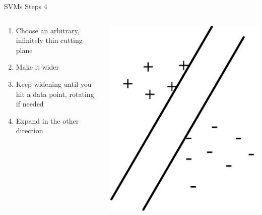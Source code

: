 \documentclass[aspectratio=169]{beamer}
\begin{document}
\begin{frame}{SVMs Steps 4}

\begin{columns}[T]
\begin{column}{0.6\textwidth}
\begin{enumerate}
\item  Choose an arbitrary, infinitely thin cutting plane
\item Make it wider
\item Keep widening until you hit a data point, rotating if needed
\item Expand in the other direction
\end{enumerate}
\end{column}
\begin{column}{0.4\textwidth}
\includegraphics[width=1\textwidth]{lectSVM/svm6}
\end{column}
\end{columns}
\end{frame}
\end{document}
